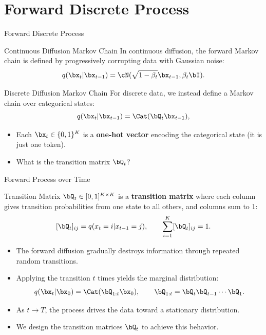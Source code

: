 \documentclass{beamer}
\begin{document}
\section{Forward Discrete Process}
\begin{frame}{Forward Discrete Process}
	\begin{block}{Continuous Diffusion Markov Chain}
		In continuous diffusion, the forward Markov chain is defined by progressively corrupting data with Gaussian noise:
		\[
			q(\bx_t|\bx_{t-1}) = \cN(\sqrt{1-\beta_t}\bx_{t-1}, \beta_t \bI).
		\]
	\end{block}
	\eqpause
	\vspace{-0.3cm}
	\begin{block}{Discrete Diffusion Markov Chain}
		For discrete data, we instead define a Markov chain over categorical states:
		\[
			q(\bx_t|\bx_{t-1}) = \Cat(\bQ_t\bx_{t-1}),
		\]
	\end{block}
	\vspace{-0.3cm}
	\eqpause
	\begin{itemize}
		\item Each $\bx_t \in \{0,1\}^K$ is a \textbf{one-hot vector} encoding the categorical state (it is just one token).
		\item What is the transition matrix $\bQ_t$?
	\end{itemize}
\end{frame}
\begin{frame}{Forward Process over Time}
	\begin{block}{Transition Matrix}
		$\bQ_t \in [0,1]^{K \times K}$ is a \textbf{transition matrix} where each column gives transition probabilities from one state to all others, and columns sum to 1:
		\vspace{-0.5cm}
		\[
			[\bQ_t]_{ij} = q(x_t = i | x_{t-1} = j),
			\qquad
			\sum_{i=1}^K [\bQ_t]_{ij} = 1.
		\]
		\vspace{-0.7cm}
	\end{block}
	\eqpause
	\begin{itemize}
		\item The forward diffusion gradually destroys information through repeated random transitions.
		\eqpause
		\item Applying the transition $t$ times yields the marginal distribution:
			\[
				q(\bx_t|\bx_0) = \Cat(\bQ_{1:t}\bx_0),
				\qquad
				\bQ_{1:t} = \bQ_t \bQ_{t-1}\cdots\bQ_1.
			\]
		\eqpause
		\vspace{-0.7cm}
		\item As $t \to T$, the process drives the data toward a stationary distribution.
		\eqpause
		\item We design the transition matrices $\bQ_t$ to achieve this behavior.
	\end{itemize}
\end{frame}
\end{document}
